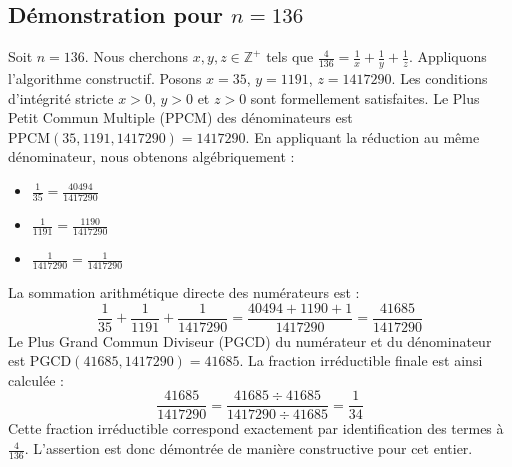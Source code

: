 \documentclass[11pt,a4paper]{article}
\begin{document}
\subsection{Démonstration pour $n = 136$}
Soit $n = 136$. Nous cherchons $x, y, z \in \mathbb{Z}^{+}$ tels que $\frac{4}{136} = \frac{1}{x} + \frac{1}{y} + \frac{1}{z}$.
Appliquons l'algorithme constructif. Posons $x = 35$, $y = 1191$, $z = 1417290$.
Les conditions d'intégrité stricte $x > 0$, $y > 0$ et $z > 0$ sont formellement satisfaites.
Le Plus Petit Commun Multiple (PPCM) des dénominateurs est $\text{PPCM}(35, 1191, 1417290) = 1417290$.
En appliquant la réduction au même dénominateur, nous obtenons algébriquement :
\begin{itemize}
    \item $\frac{1}{35} = \frac{40494}{1417290}$
    \item $\frac{1}{1191} = \frac{1190}{1417290}$
    \item $\frac{1}{1417290} = \frac{1}{1417290}$
\end{itemize}
La sommation arithmétique directe des numérateurs est :
$$ \frac{1}{35} + \frac{1}{1191} + \frac{1}{1417290} = \frac{40494 + 1190 + 1}{1417290} = \frac{41685}{1417290} $$
Le Plus Grand Commun Diviseur (PGCD) du numérateur et du dénominateur est $\text{PGCD}(41685, 1417290) = 41685$.
La fraction irréductible finale est ainsi calculée :
$$ \frac{41685}{1417290} = \frac{41685 \div 41685}{1417290 \div 41685} = \frac{1}{34} $$
Cette fraction irréductible correspond exactement par identification des termes à $\frac{4}{136}$. L'assertion est donc démontrée de manière constructive pour cet entier.
\end{document}
